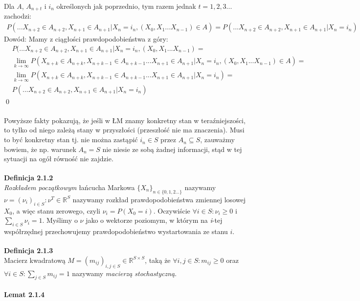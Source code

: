 \documentclass[a4paper]{article}
\begin{document}
Dla $A$, $A_{n+t}$ i $i_n$ określonych jak poprzednio, tym razem jednak $t = 1,2,3...$ zachodzi:
\begin{align*}
P(...X_{n+2} \in A_{n+2}, X_{n+1} \in A_{n+1}|X_n = i_n, (X_{0}, X_{1} ... X_{n-1}) \in A) = P(...X_{n+2} \in A_{n+2}, X_{n+1} \in A_{n+1}|X_n = i_n)
\end{align*}
Dowód: Mamy z ciągłości prawdopodobieństwa z góry:
\begin{align*}
&P(...X_{n+2} \in A_{n+2}, X_{n+1} \in A_{n+1}|X_n = i_n, (X_{0}, X_{1} ... X_{n-1}) =\\ &\lim_{k \to \infty} P(X_{n+k} \in A_{n+k}, X_{n+k-1} \in A_{n+k-1}...X_{n+1} \in A_{n+1}|X_n = i_n, (X_{0}, X_{1} ... X_{n-1}) \in A) = \\
&\lim_{k \to \infty} P(X_{n+k} \in A_{n+k}, X_{n+k-1} \in A_{n+k-1}...X_{n+1} \in A_{n+1}|X_n = i_n) = \\
&P(...X_{n+2} \in A_{n+2}, X_{n+1} \in A_{n+1}|X_n = i_n)
\end{align*}
\qed
\\\\
Powyższe fakty pokazują, że jeśli w ŁM znamy konkretny stan w teraźniejszości, to tylko od niego zależą stany w przyszłości (przeszłość nie ma znaczenia). Musi to być konkretny stan tj. nie można zastąpić $i_n \in S$ przez $A_n \subseteq S$, zauważmy bowiem, że np. warunek $A_n = S$ nie niesie ze sobą żadnej informacji, stąd w tej sytuacji na ogół równość nie zajdzie.
\\\\
\textbf{Definicja 2.1.2}\\
\textit{Rozkładem początkowym}  łańcucha Markowa $\{X_n\}_{n \in \{0,1,2...\}}$ nazywamy $\nu = (\nu_i)_{i \in S}: \nu^T \in \mathbb{R}^S$ nazywamy rozkład prawdopodobieństwa zmiennej losowej $X_0$, a więc stanu zerowego, czyli $\nu_i = P(X_0 = i)$. Oczywiście $\forall i \in S: \nu_i \geq 0$ i $\sum\limits_{i \in S}\nu_i = 1$. Myślimy o $\nu$ jako o wektorze poziomym, w którym na \textit{i}-tej współrzędnej przechowujemy prawdopodobieństwo wystartowania ze stanu $i$.
\\\\\textbf{Definicja 2.1.3}\\
Macierz kwadratową $M = (m_{ij})_{i,j \in S} \in \mathbb{R}^{S \times S}$, taką że $\forall i, j \in S: m_{ij} \geq 0$ oraz $\forall i \in S: \sum\limits_{j \in S} m_{ij} = 1$ nazywamy \textit{macierzą stochastyczną}. 
\\\\
\textbf{Lemat 2.1.4}\\
\end{document}
